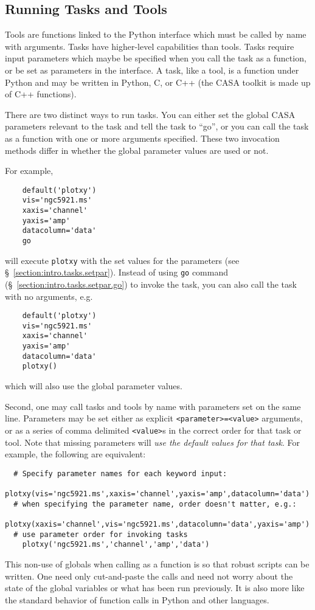
\subsection{Running Tasks and Tools}
\label{section:intro.tasks.run}

Tools are functions linked to the Python interface which must be
called by name with arguments.  Tasks have higher-level capabilities
than tools.  Tasks require input parameters which maybe be specified
when you call the task as a function, or be set as parameters in the
interface.  A task, like a tool, is a function under Python and may be
written in Python, C, or C++ (the CASA toolkit is made up of C++
functions).

There are two distinct ways to run tasks. You can either set the
global CASA parameters relevant to the task and
tell the task to ``go'', or you can call the task as a function with
one or more arguments specified.  These two invocation methods differ
in whether the global parameter values are used or not.

For example,
\small
\begin{verbatim}
    default('plotxy')
    vis='ngc5921.ms'
    xaxis='channel'
    yaxis='amp'
    datacolumn='data'
    go
\end{verbatim}
\normalsize
will execute {\tt plotxy} with the set values for the parameters
(see \S~\ref{section:intro.tasks.setpar}).  Instead of using 
{\tt go} command (\S~\ref{section:intro.tasks.setpar.go}) to invoke
the task, you can also call the task with no arguments, e.g.
\small
\begin{verbatim}
    default('plotxy')
    vis='ngc5921.ms'
    xaxis='channel'
    yaxis='amp'
    datacolumn='data'
    plotxy()
\end{verbatim}
\normalsize
which will also use the global parameter values.

Second, one may call tasks and tools by name with parameters set
on the same line.  Parameters may be set either as explicit
{\tt <parameter>=<value>} arguments, or as a series of comma delimited
{\tt <value>}s in the correct order for that task or tool.  Note that missing
parameters will {\em use the default values for that task}.
For example, the following are equivalent:
\small
\begin{verbatim}
  # Specify parameter names for each keyword input: 
    plotxy(vis='ngc5921.ms',xaxis='channel',yaxis='amp',datacolumn='data')
  # when specifying the parameter name, order doesn't matter, e.g.:
    plotxy(xaxis='channel',vis='ngc5921.ms',datacolumn='data',yaxis='amp')
  # use parameter order for invoking tasks
    plotxy('ngc5921.ms','channel','amp','data')
\end{verbatim}
\normalsize
This non-use of globals when calling as a function is so that robust 
scripts can be written.  One need only cut-and-paste the calls and
need not worry about the state of the global variables or what has
been run previously.  It is also more like the standard behavior of
function calls in Python and other languages.

